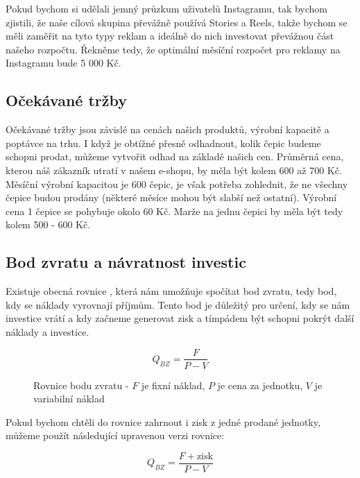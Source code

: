 \documentclass[12pt, a4paper]{article}
\begin{document}
\noindent Pokud bychom si udělali jemný průzkum uživatelů Instagramu, tak bychom zjistili, že
naše cílová skupina převážně používá Stories a Reels, takže bychom se měli zaměřit na tyto typy reklam
a ideálně do nich investovat převážnou část našeho rozpočtu. Řekněme tedy, že optimální měsíční
rozpočet pro reklamy na Instagramu bude 5 000 Kč.

\subsection{Očekávané tržby}

Očekávané tržby jsou závislé na cenách našich produktů, výrobní kapacitě a poptávce na trhu.
I když je obtížné přesně odhadnout, kolik čepic budeme schopni prodat, můžeme vytvořit odhad na základě našich cen.
Průměrná cena, kterou náš zákazník utratí v našem e-shopu, by měla být kolem 600 až 700 Kč.
Měsíční výrobní kapacitou je 600 čepic, je však potřeba zohlednit, že ne všechny čepice budou prodány
(některé měsíce mohou být slabší než ostatní).
Výrobní cena 1 čepice se pohybuje okolo 60 Kč.
Marže na jednu čepici by měla být tedy kolem 500 - 600 Kč.

\subsection{Bod zvratu a návratnost investic}

Existuje obecná rovnice \cite{bod-zvratu}, která nám umožňuje spočítat bod zvratu, tedy bod, kdy se náklady vyrovnají příjmům.
Tento bod je důležitý pro určení, kdy se nám investice vrátí a kdy začneme generovat zisk a tímpádem
být schopni pokrýt další náklady a investice.

\begin{figure}[h]
  \centering
  \captionsetup{justification=centering}
  \begin{equation}
    Q_{BZ}=\frac{F}{P-V}
  \end{equation}
  \caption{Rovnice bodu zvratu - $F$ je fixní náklad, $P$ je cena za jednotku, $V$ je variabilní náklad}
\end{figure}

\noindent Pokud bychom chtěli do rovnice zahrnout i zisk z jedné prodané jednotky, můžeme použít následující upravenou verzi rovnice:

\begin{figure}[h]
  \centering
  \captionsetup{justification=centering}
  \begin{equation}
    Q_{BZ}=\frac{F+\text{zisk}}{P-V}
  \end{equation}
\end{figure}
\end{document}
